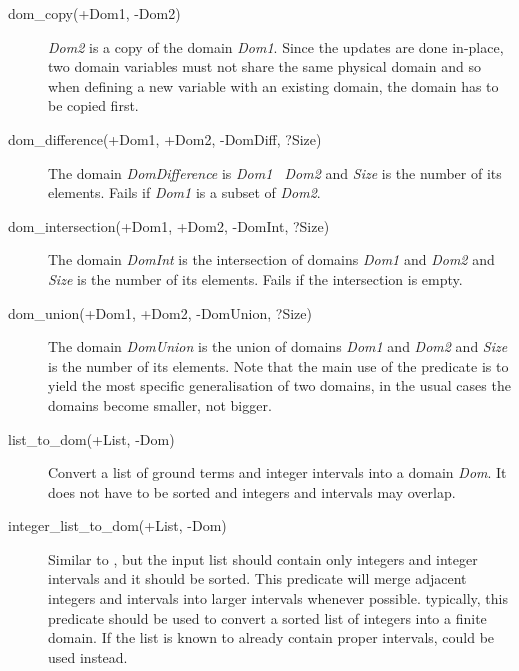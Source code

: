 \begin{description}
\item[dom_copy(+Dom1, -Dom2)]
{\it Dom2} is a copy of the domain {\it Dom1}.
Since the updates are done in-place, two domain variables must not share
the same physical domain and so when defining a new variable
with an existing domain, the domain has to be copied first.

\item[dom_difference(+Dom1, +Dom2, -DomDiff, ?Size)]
The domain {\it DomDifference} is
{\it Dom1 \bsl\ Dom2}
and {\it Size} is the number of its elements.
Fails if {\it Dom1} is a subset of {\it Dom2}.

\item[dom_intersection(+Dom1, +Dom2, -DomInt, ?Size)]
The domain {\it DomInt} is the intersection of domains
{\it Dom1} and {\it Dom2} and {\it Size} is the number of its elements.
Fails if the intersection is empty.



\item[dom_union(+Dom1, +Dom2, -DomUnion, ?Size)]
The domain {\it DomUnion} is the union of domains
{\it Dom1} and {\it Dom2} and {\it Size} is the number of its elements.
Note that the main use of the predicate is to yield
the most specific generalisation of two domains, in the usual cases
the domains become smaller, not bigger.

\item[list_to_dom(+List, -Dom)]
Convert a list of ground terms and integer intervals into
a domain {\it Dom}.
It does not have to be sorted and integers and intervals
may overlap.

\item[integer_list_to_dom(+List, -Dom)]
Similar to  , but the input list should
contain only integers and integer intervals and it should be sorted.
This predicate will merge adjacent integers and intervals
into larger intervals whenever possible.
typically, this predicate should be used to convert
a sorted list of integers into a finite domain.
If the list is known to already contain proper intervals,
 could be used instead.


\end{description}
